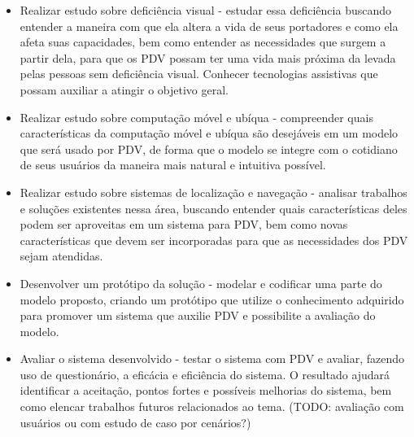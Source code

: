 \documentclass[english,brazilian]{UNISINOSmonografia}
\begin{document}
		\begin{itemize}
			\item Realizar estudo sobre deficiência visual - estudar essa deficiência buscando entender a maneira com que ela altera a vida de seus portadores e como ela afeta suas capacidades, bem como entender as necessidades que surgem a partir dela, para que os PDV possam ter uma vida mais próxima da levada pelas pessoas sem deficiência visual. Conhecer tecnologias assistivas que possam auxiliar a atingir o objetivo geral.

			\item Realizar estudo sobre computação móvel e ubíqua - compreender quais características da computação móvel e ubíqua são desejáveis em um modelo que será usado por PDV, de forma que o modelo se integre com o cotidiano de seus usuários da maneira mais natural e intuitiva possível.

			\item Realizar estudo sobre sistemas de localização e navegação - analisar trabalhos e soluções existentes nessa área, buscando entender quais características deles podem ser aproveitas em um sistema para PDV, bem como novas características que devem ser incorporadas para que as necessidades dos PDV sejam atendidas.

			\item Desenvolver um protótipo da solução - modelar e codificar uma parte do modelo proposto, criando um protótipo que utilize o conhecimento adquirido para promover um sistema que auxilie PDV e 
			possibilite a avaliação do modelo.

			\item Avaliar o sistema desenvolvido - testar o sistema com PDV e avaliar, fazendo uso de questionário, a eficácia e eficiência do sistema. O resultado ajudará identificar a aceitação, pontos fortes e possíveis melhorias do sistema, bem como elencar trabalhos futuros relacionados ao tema. (TODO: avaliação com usuários ou com estudo de caso por cenários?) 
		\end{itemize}
\end{document}
